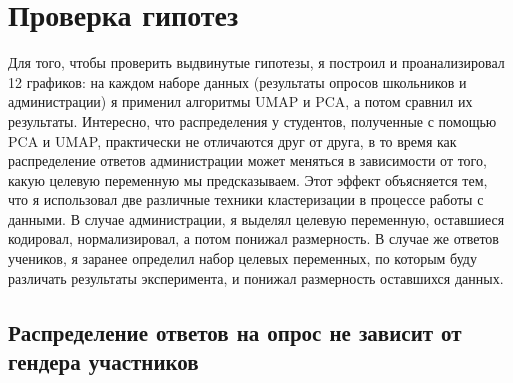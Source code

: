 \section{Проверка гипотез}

Для того, чтобы проверить выдвинутые гипотезы, я построил и проанализировал 12 графиков: на каждом наборе данных (результаты опросов школьников и администрации) я применил алгоритмы UMAP и PCA, а потом сравнил их результаты.
Интересно, что распределения у студентов, полученные с помощью PCA и UMAP, практически не отличаются друг от друга, в то время как распределение ответов администрации может меняться в зависимости от того, какую целевую переменную мы предсказываем.
Этот эффект объясняется тем, что я использовал две различные техники кластеризации в процессе работы с данными.
В случае администрации, я выделял целевую переменную, оставшиеся кодировал, нормализировал, а потом понижал размерность.
В случае же ответов учеников, я заранее определил набор целевых переменных, по которым буду различать результаты эксперимента, и понижал размерность оставшихся данных.

\subsection{Распределение ответов на опрос не зависит от гендера участников} \label{hypothesis::1}


